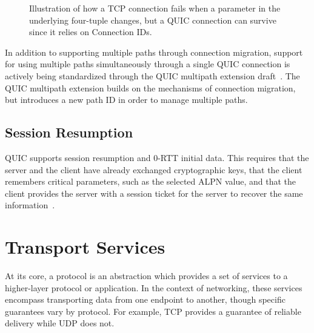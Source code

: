 \begin{figure}[htbp]
\caption[TCP four-tuple vs. QUIC connection ID after path event]
{
Illustration of how a TCP connection fails when a parameter in the underlying
four-tuple changes, but a QUIC connection can survive since it relies on Connection
IDs.
}
\label{fig:connectionBeforeAfterMigration}
\end{figure}

In addition to supporting multiple paths through connection migration,
support for using multiple paths simultaneously through a single QUIC 
connection is actively being
standardized through the QUIC multipath extension draft~\cite{ietf-quic-multipath-21}.
The QUIC multipath extension builds on the mechanisms of connection migration,
but introduces a new path ID in order to manage multiple paths.

\subsection{Session Resumption}\label{sec:back-session-resumption}
QUIC supports session resumption and 0-RTT
initial data. This requires that the server and the client
have already exchanged cryptographic keys, that the
client remembers critical parameters, such as the selected
ALPN value,
and that the client provides the server with a
session ticket for the server to recover the same
information~\cite[sec.~4.6]{rfc9001}.

\section{Transport Services}
At its core, a protocol is an abstraction which provides a set of
services to a higher-layer protocol or application. In the context of
networking, these services encompass transporting data from one endpoint
to another, though specific guarantees vary by protocol.
For example, TCP provides a guarantee of reliable
delivery while UDP does not.

